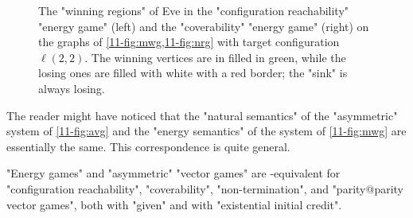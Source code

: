 \begin{figure}[htbp]
{}
  \caption{The "winning regions" of Eve in the
    "configuration reachability" "energy game" (left) and the
    "coverability" "energy game"
    (right) on the graphs of \cref{11-fig:mwg,11-fig:nrg} with target
    configuration~$\ell(2,2)$.  The winning vertices are in filled in
    green, while the losing ones are filled with white with a red
    border; the "sink" is always losing.}\label{11-fig:cov-nrg}
\end{figure}

The reader might have noticed that the "natural semantics" of the
"asymmetric" system of \cref{11-fig:avg} and the "energy semantics" of
the system of \cref{11-fig:mwg} are essentially the same.  This
correspondence is quite general.
\begin{lemma}
\label{11-lem:nrg}
  "Energy games" and "asymmetric" "vector games" are
  \logspace-equivalent for "configuration reachability",
  "coverability", "non-termination", and "parity@parity vector games",
  both with "given" and with "existential initial credit".
\end{lemma}
